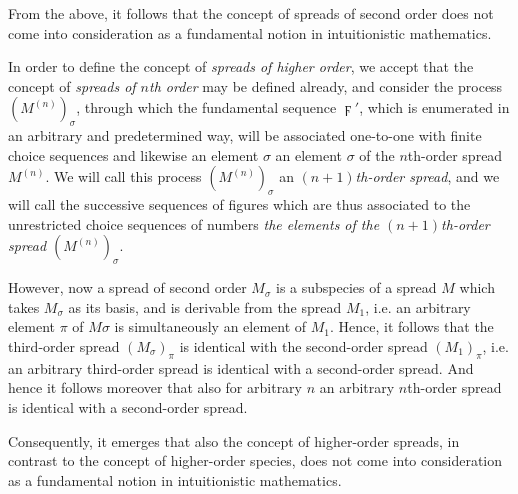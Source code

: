 \documentclass{amsart}
\begin{document}
From the above, it follows that the concept of spreads of second order does not
come into consideration as a fundamental notion in intuitionistic mathematics.

\bigskip

In order to define the concept of \emph{spreads of higher order}, we accept
that the concept of \emph{spreads of $n$th order} may be defined already, and
consider the process $\left(M^{(n)}\right)_\sigma$, through which the
fundamental sequence $\digamma'$, which is enumerated in an arbitrary and
predetermined way, will be associated one-to-one with finite choice sequences
and likewise an element $\sigma$ an element $\sigma$ of the $n$th-order spread
$M^{(n)}$. We will call this process $\left(M^{(n)}\right)_\sigma$ an
\emph{$(n+1)$th-order spread}, and we will call the successive sequences of
figures which are thus associated to the unrestricted choice sequences of
numbers \emph{the elements of the $(n+1)$th-order spread
$\left(M^{(n)}\right)_\sigma$}.

However, now a spread of second order $M_\sigma$ is a subspecies of a spread
$M$ which takes $M_\sigma$ as its basis, and is derivable from the spread
$M_1$, i.e. an arbitrary element $\pi$ of $M\sigma$ is simultaneously an
element of $M_1$. Hence, it follows that the third-order spread
$\left(M_\sigma\right)_\pi$ is identical with the second-order spread
$\left(M_1\right)_\pi$, i.e. an arbitrary third-order spread is identical with
a second-order spread. And hence it follows moreover that also for arbitrary
$n$ an arbitrary $n$th-order spread is identical with a second-order spread.

Consequently, it emerges that also the concept of higher-order spreads, in
contrast to the concept of higher-order species, does not come into
consideration as a fundamental notion in intuitionistic mathematics.
\end{document}
